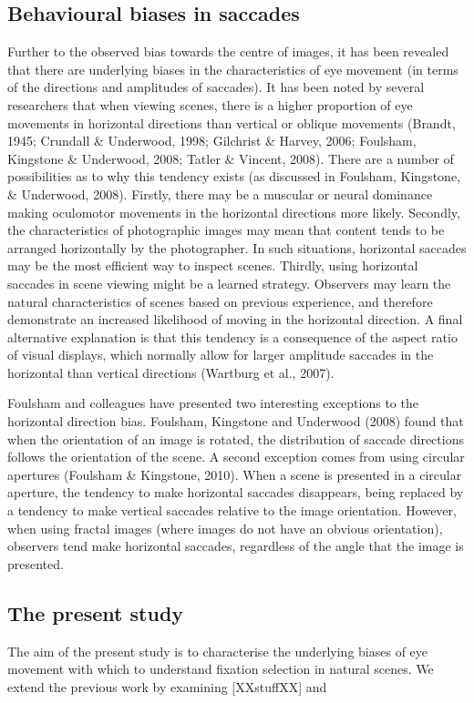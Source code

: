 \documentclass[a4paper, onecolumn, oneside, 11pt]{article}
\begin{document}
\subsection{Behavioural biases in saccades}
Further to the observed bias towards the centre of images, it has been revealed that there are underlying biases in the characteristics of eye movement (in terms of the directions and amplitudes of saccades). It has been noted by several researchers that when viewing scenes, there is a higher proportion of eye movements in horizontal directions than vertical or oblique movements (Brandt, 1945; Crundall \& Underwood, 1998; Gilchrist \& Harvey, 2006; Foulsham, Kingstone \& Underwood, 2008; Tatler \& Vincent, 2008). There are a number of possibilities as to why this tendency exists (as discussed in Foulsham, Kingstone, \& Underwood, 2008). Firstly, there may be a muscular or neural dominance making oculomotor movements in the horizontal directions more likely. Secondly, the characteristics of photographic images may mean that content tends to be arranged horizontally by the photographer. In such situations, horizontal saccades may be the most efficient way to inspect scenes. Thirdly, using horizontal saccades in scene viewing might be a learned strategy. Observers may learn the natural characteristics of scenes based on previous experience, and therefore demonstrate an increased likelihood of moving in the horizontal direction. A final alternative explanation is that this tendency is a consequence of the aspect ratio of visual displays, which normally allow for larger amplitude saccades in the horizontal than vertical directions (Wartburg et al., 2007).

Foulsham and colleagues have presented two interesting exceptions to the horizontal direction bias. Foulsham, Kingstone and Underwood (2008) found that when the orientation of an image is rotated, the distribution of saccade directions follows the orientation of the scene. A second exception comes from using circular apertures (Foulsham \& Kingstone, 2010). When a scene is presented in a circular aperture, the tendency to make horizontal saccades disappears, being replaced by a tendency to make vertical saccades relative to the image orientation. However, when using fractal images (where images do not have an obvious orientation), observers tend make horizontal saccades, regardless of the angle that the image is presented.


\subsection{The present study}
The aim of the present study is to characterise the underlying biases of eye movement with which to understand fixation selection in natural scenes. We extend the previous work by examining [XXstuffXX] and 
\end{document}
